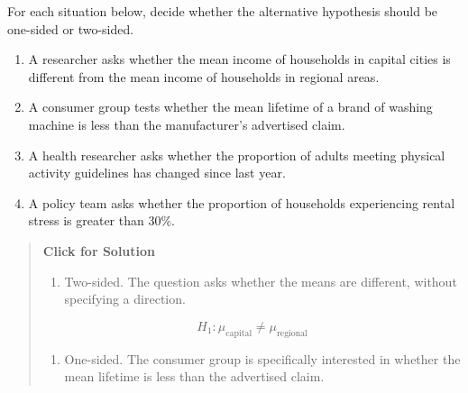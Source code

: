 \documentclass[
  letterpaper,
  DIV=11,
  numbers=noendperiod]{scrreprt}
\providecommand{\tightlist}{%
  \setlength{\itemsep}{0pt}\setlength{\parskip}{0pt}}
\begin{document}
\begin{tcolorbox}[enhanced jigsaw, arc=.35mm, bottomrule=.15mm, bottomtitle=1mm, breakable, colback=white, colbacktitle=quarto-callout-note-color!10!white, colframe=quarto-callout-note-color-frame, coltitle=black, left=2mm, leftrule=.75mm, opacityback=0, opacitybacktitle=0.6, rightrule=.15mm, title=\textcolor{quarto-callout-note-color}{\faInfo}\hspace{0.5em}{Question 3}, titlerule=0mm, toprule=.15mm, toptitle=1mm]

For each situation below, decide whether the alternative hypothesis
should be one-sided or two-sided.

\begin{enumerate}
\def\labelenumi{\alph{enumi}.}
\tightlist
\item
  A researcher asks whether the mean income of households in capital
  cities is different from the mean income of households in regional
  areas.\\
\item
  A consumer group tests whether the mean lifetime of a brand of washing
  machine is less than the manufacturer's advertised claim.\\
\item
  A health researcher asks whether the proportion of adults meeting
  physical activity guidelines has changed since last year.\\
\item
  A policy team asks whether the proportion of households experiencing
  rental stress is greater than 30\%.
\end{enumerate}

\begin{quote}
\textbf{Click for Solution}

\begin{enumerate}
\def\labelenumi{\alph{enumi}.}
\tightlist
\item
  Two-sided. The question asks whether the means are different, without
  specifying a direction.
\end{enumerate}

\[
H_1: \mu_{\text{capital}} \neq \mu_{\text{regional}}
\]

\begin{enumerate}
\def\labelenumi{\alph{enumi}.}
\setcounter{enumi}{1}
\tightlist
\item
  One-sided. The consumer group is specifically interested in whether
  the mean lifetime is less than the advertised claim.
\end{enumerate}


\end{quote}
\end{tcolorbox}
\end{document}
